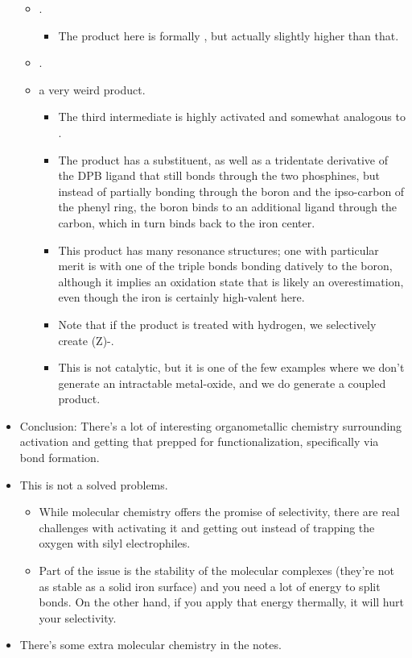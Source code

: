 \documentclass[../notes.tex]{subfiles}
\begin{document}
\begin{itemize}
\begin{itemize}
        \item {}.
        \begin{itemize}
            \item The product here is formally , but actually slightly higher than that.
        \end{itemize}
        \item {}.
        \item {} a very weird product.
        \begin{itemize}
            \item The third intermediate is highly activated and somewhat analogous to .
            \item The product has a  substituent, as well as a tridentate derivative of the DPB ligand that still bonds through the two phosphines, but instead of partially bonding through the boron and the ipso-carbon of the phenyl ring, the boron binds to an additional  ligand through the carbon, which in turn binds back to the iron center.
            \item This product has many resonance structures; one with particular merit is  with one of the triple bonds bonding datively to the boron, although it implies an  oxidation state that is likely an overestimation, even though the iron is certainly high-valent here.
            \item Note that if the product is treated with hydrogen, we selectively create (Z)-.
            \item This is not catalytic, but it is one of the few examples where we don't generate an intractable metal-oxide, and we do generate a  coupled product.
        \end{itemize}
    \end{itemize}
    \item Conclusion: There's a lot of interesting organometallic chemistry surrounding  activation and getting that prepped for functionalization, specifically via  bond formation.
    \item This is not a solved problems.
    \begin{itemize}
        \item While molecular chemistry offers the promise of selectivity, there are real challenges with activating it and getting  out instead of trapping the oxygen with silyl electrophiles.
        \item Part of the issue is the stability of the molecular complexes (they're not as stable as a solid iron surface) and you need a lot of energy to split  bonds. On the other hand, if you apply that energy thermally, it will hurt your selectivity.
    \end{itemize}
    \item There's some extra molecular chemistry in the notes.
\end{itemize}
\end{document}
